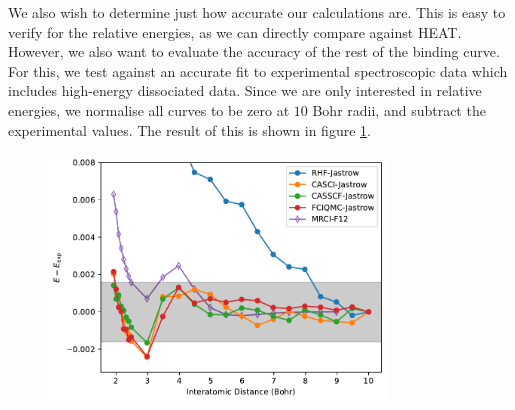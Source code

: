 We also wish to determine just how accurate our calculations are. This is easy to verify for the relative energies, as we can directly compare against HEAT.\supercite{fellerSurvey2008} However, we also want to evaluate the accuracy of the rest of the binding curve. For this, we test against an accurate fit to experimental spectroscopic data which includes high-energy dissociated data.\supercite{leroyAccurate2006} Since we are only interested in relative energies, we normalise all curves to be zero at $10$ Bohr radii, and subtract the experimental values. The result of this is shown in figure \ref{fig:binding-curves-experiment}.


\begin{figure}[htbp]
    \centering
    \includegraphics[width=0.8\textwidth]{figures/binding/residuals}
    \caption{}
    \label{fig:binding-curves-experiment}
\end{figure}




